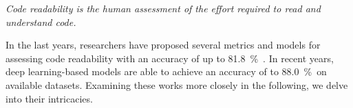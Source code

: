 \documentclass[%
class=scrreprt,
chapterprefix=false,%
open=right,%
twoside=false,%
paper=a4,%
logofile={Logo\_zentral\_farbig\_EN.png},%
thesistype=master,%
UKenglish,%
]{se2thesis}
\theoremstyle{definition}
\newcommand{\citeclassicmodels}{\cite{buse2009learning, posnett2011simpler, dorn2012general, scalabrino2018comprehensive}}
\newcommand{\citedeepmodels}{\cite{mi2018inception, mi2018improving, sharma2020egan, mi2022towards, mi2022rank, mi2023graph}}
\begin{document}
	\textit{Code readability is the human assessment of the effort required to read and understand code.}

	In the last years, researchers have proposed several metrics and models for assessing code readability with an accuracy of up to 81.8~\%~\citeclassicmodels. In recent years, deep learning-based models are able to achieve an accuracy of to 88.0~\%~\citedeepmodels on available datasets. 
	Examining these works more closely in the following, we delve into their intricacies.
	
\end{document}
